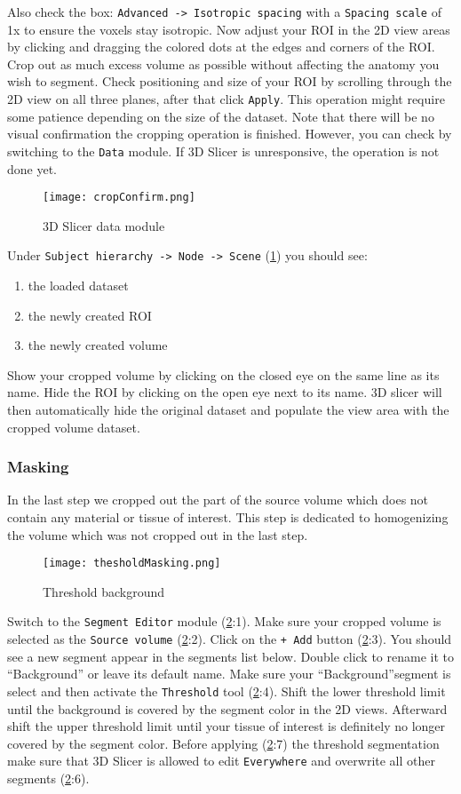 Also check the box: \texttt{Advanced -> Isotropic spacing} with a \texttt{Spacing scale} of 1x to ensure the voxels stay isotropic.
Now adjust your ROI in the 2D view areas by clicking and dragging the colored dots at the edges and corners of the ROI.
Crop out as much excess volume as possible without affecting the anatomy you wish to segment.
Check positioning and size of your ROI by scrolling through the 2D view on all three planes, after that click \texttt{Apply}.
This operation might require some patience depending on the size of the dataset.
Note that there will be no visual confirmation the cropping operation is finished.
However, you can check by switching to the \texttt{Data} module.
If 3D Slicer is unresponsive, the operation is not done yet.
\newline
\begin{figure}[h!]
	\centerline{
		\texttt{[image: cropConfirm.png]}}
	\caption{3D Slicer data module}\label{fig:cC}
\end{figure}
\newline
\noindent
Under \texttt{Subject hierarchy -> Node -> Scene} (\cref{fig:cC}) you should see:
\begin{enumerate}
	\item the loaded dataset
	\item the newly created ROI
	\item the newly created volume
\end{enumerate}
Show your cropped volume by clicking on the closed eye on the same line as its name. Hide the ROI by clicking on the open eye next to its name.
3D slicer will then automatically hide the original dataset and populate the view area with the cropped volume dataset.

\subsubsection{Masking}\label{mask}
In the last step we cropped out the part of the source volume which does not contain any material or tissue of interest.
This step is dedicated to homogenizing the volume which was not cropped out in the last step.
\begin{figure}[h!]
	\centerline{
		\texttt{[image: thesholdMasking.png]}}
	\caption{Threshold background}\label{fig:tM}
\end{figure}
Switch to the \texttt{Segment Editor} module (\cref{fig:tM}:1).
Make sure your cropped volume is selected as the \texttt{Source volume} (\cref{fig:tM}:2).
Click on the \texttt{+ Add} button (\cref{fig:tM}:3). You should see a new segment appear in the segments list below.
Double click to rename it to ``Background'' or leave its default name.
Make sure your ``Background''segment is select and then activate the \texttt{Threshold} tool (\cref{fig:tM}:4).
Shift the lower threshold limit until the background is covered by the segment color in the 2D views. Afterward shift the upper threshold limit until your tissue of interest is definitely no longer covered by the segment color.
Before applying (\cref{fig:tM}:7) the threshold segmentation make sure that 3D Slicer is allowed to edit \texttt{Everywhere} and overwrite all other segments (\cref{fig:tM}:6).

